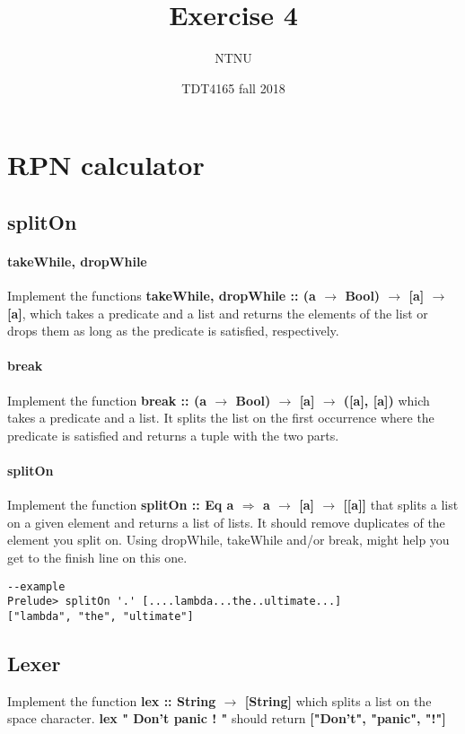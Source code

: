 \documentclass{article}
\title{Exercise 4}
\author{NTNU}
\date{TDT4165 fall 2018}
\begin{document}
\maketitle

\section{RPN calculator}

\subsection{splitOn}
\paragraph{takeWhile, dropWhile}
Implement the functions \textbf{takeWhile, dropWhile :: (a $\rightarrow$ Bool) $\rightarrow$ [a] $\rightarrow$ [a]}, which takes a predicate and a list and returns the elements of the list or drops them as long as the predicate is satisfied, respectively.

\paragraph{break}
Implement the function \textbf{break :: (a $\rightarrow$ Bool) $\rightarrow$ [a] $\rightarrow$ ([a], [a])} which takes a predicate and a list. It splits the list on the first occurrence where the predicate is satisfied and returns a tuple with the two parts.

\paragraph{splitOn}
Implement the function \textbf{splitOn :: Eq a $\Rightarrow$ a $\rightarrow$ [a] $\rightarrow$ [[a]]} that splits a list on a given element and returns a list of lists. It should remove duplicates of the element you split on. Using dropWhile, takeWhile and/or break, might help you get to the finish line on this one.
\begin{lstlisting}
--example
Prelude> splitOn '.' [....lambda...the..ultimate...]
["lambda", "the", "ultimate"]
\end{lstlisting}

\subsection{Lexer}
Implement the function \textbf{lex :: String $\rightarrow$ [String]} which splits a list on the space character.
\textbf{lex " Don't   panic  ! "} should return \textbf{["Don't", "panic", "!"]}
\end{document}
